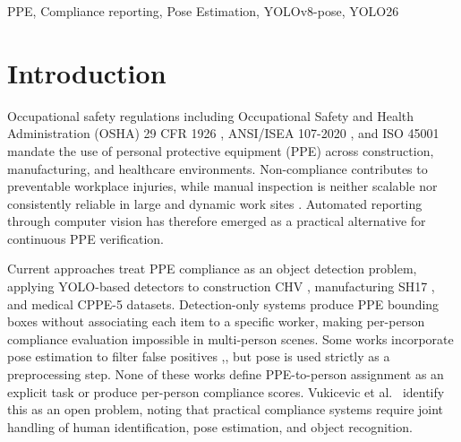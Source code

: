 \documentclass[conference,a4paper]{IEEEtran}
\begin{document}
\begin{abstract}
Automated systems that detect personal protective equipment (PPE) in images typically report only scene-level presence, failing to assign each item to a specific worker and preventing per-worker compliance checks required by safety regulations. This paper addresses this gap with Pose-Anchored Compliance Tracker (PACT), a three-stage pipeline. First, a YOLO26L detector locates PPE items and a YOLOv8x-pose model identifies workers and body keypoints. Second, a pose-anchored matching module attributes each detected PPE instance to the corresponding person. Third, a rule-based reporter computes fractional compliance scores and severity-tiered violation notices for each worker. We evaluate on three public datasets: construction-site CHV, medical PPE CPPE-5, and industrial SH17. PACT achieves mean average precision at IoU 0.50 (mAP\textsubscript{50}) of 0.923 on CHV and 0.652 on SH17, while per-person assignment accuracy reaches 0.938 on CHV and 0.892 on SH17. These results demonstrate that pose estimation enables reliable person-level PPE attribution and that assignment accuracy is a measurable target for compliance reporting.
\end{abstract}


\begin{IEEEkeywords}
PPE,
Compliance reporting,
Pose Estimation,
YOLOv8-pose,
YOLO26
\end{IEEEkeywords} 



\section{Introduction}
Occupational safety regulations including Occupational Safety and Health Administration (OSHA) 29 CFR 1926 \cite{OSHA_CFR1926}, ANSI/ISEA 107-2020 \cite{ANSI_ISEA107}, and ISO 45001 \cite{ISO45001} mandate the use of personal protective equipment (PPE) across construction, manufacturing, and healthcare environments. Non-compliance contributes to preventable workplace injuries, while manual inspection is neither scalable nor consistently reliable in large and dynamic work sites \cite{ref6}. Automated reporting through computer vision has therefore emerged as a practical alternative for continuous PPE verification.

Current approaches treat PPE compliance as an object detection problem, applying YOLO-based detectors to construction CHV \cite{ref5}, manufacturing SH17 \cite{ref2}, and medical CPPE-5 \cite{ref1} datasets. Detection-only systems produce PPE bounding boxes without associating each item to a specific worker, making per-person compliance evaluation impossible in multi-person scenes. Some works incorporate pose estimation to filter false positives \cite{ref8},\cite{ref12},\cite{ref13} but pose is used strictly as a preprocessing step. None of these works define PPE-to-person assignment as an explicit task or produce per-person compliance scores. Vukicevic et al.\ \cite{ref6} identify this as an open problem, noting that practical compliance systems require joint handling of human identification, pose estimation, and object recognition.
\end{document}
